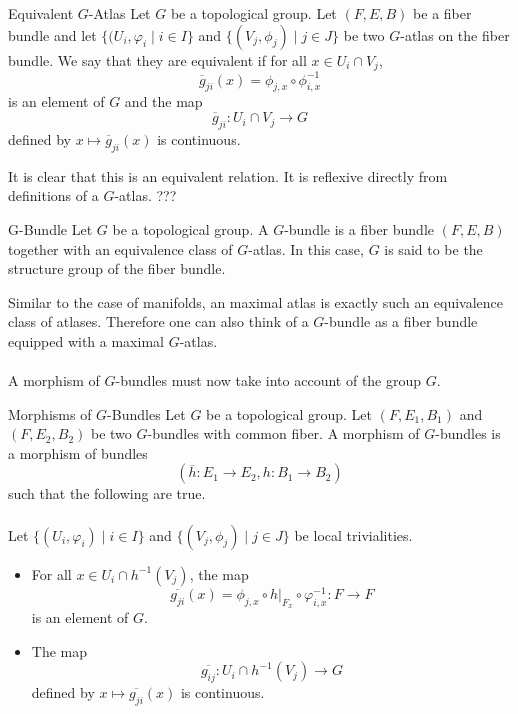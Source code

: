 \documentclass[a4paper]{article}
\begin{document}
\begin{defn}{Equivalent $G$-Atlas}{} Let $G$ be a topological group. Let $(F,E,B)$ be a fiber bundle and let $\{(U_i,\varphi_i\;|\;i\in I\}$ and $\{(V_j,\phi_j)\;|\;j\in J\}$ be two $G$-atlas on the fiber bundle. We say that they are equivalent if for all $x\in U_i\cap V_j$, $$\overline{g}_{ji}(x)=\phi_{j,x}\circ\phi_{i,x}^{-1}$$ is an element of $G$ and the map $$\overline{g}_{ji}:U_i\cap V_j\to G$$ defined by $x\mapsto\overline{g}_{ji}(x)$ is continuous. 
\end{defn}

It is clear that this is an equivalent relation. It is reflexive directly from definitions of a $G$-atlas. ???

\begin{defn}{G-Bundle}{} Let $G$ be a topological group. A $G$-bundle is a fiber bundle $(F,E,B)$ together with an equivalence class of $G$-atlas. In this case, $G$ is said to be the structure group of the fiber bundle. 
\end{defn}

Similar to the case of manifolds, an maximal atlas is exactly such an equivalence class of atlases. Therefore one can also think of a $G$-bundle as a fiber bundle equipped with a maximal $G$-atlas. \\~\\

A morphism of $G$-bundles must now take into account of the group $G$. 

\begin{defn}{Morphisms of $G$-Bundles}{} Let $G$ be a topological group. Let $(F,E_1,B_1)$ and $(F,E_2,B_2)$ be two $G$-bundles with common fiber. A morphism of $G$-bundles is a morphism of bundles $$(\overline{h}:E_1\to E_2,h:B_1\to B_2)$$ such that the following are true. \\~\\

Let $\{(U_i,\varphi_i)\;|\;i\in I\}$ and $\{(V_j,\phi_j)\;|\;j\in J\}$ be local trivialities. 
\begin{itemize}
\item For all $x\in U_i\cap h^{-1}(V_j)$, the map $$\overline{g_{ji}}(x)=\phi_{j,x}\circ h|_{F_x}\circ\varphi_{i,x}^{-1}:F\to F$$ is an element of $G$. 
\item The map $$\overline{g_{ij}}:U_i\cap h^{-1}(V_j)\to G$$ defined by $x\mapsto\overline{g_{ji}}(x)$ is continuous. 
\end{itemize}
\end{defn}
\end{document}
